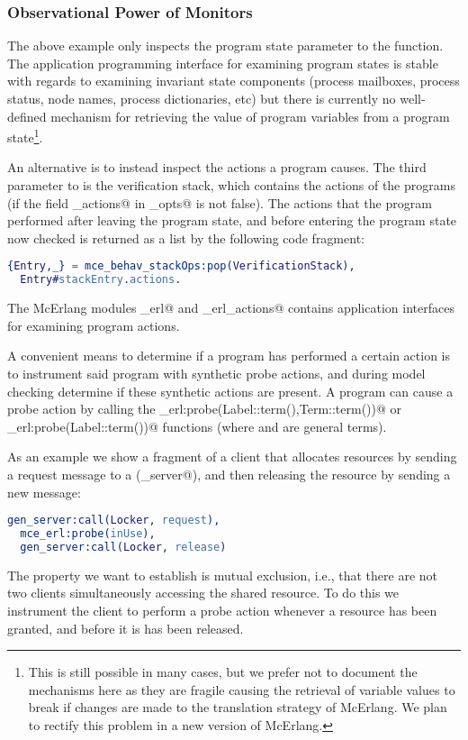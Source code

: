 \documentclass[a4paper]{article}
\begin{document}
\subsubsection{Observational Power of Monitors}
The above example only inspects the program
state parameter to the \lstinline@stateChange@ function.
The application programming interface for examining program states
is stable with regards to examining invariant state components
(process mailboxes, process status, node names, 
process dictionaries, etc) but there is currently no well-defined
mechanism for retrieving the value of program variables from 
a program state\footnote{This is still possible in many cases,
but we prefer not to document the mechanisms here as they are fragile
causing the retrieval of variable values
to break if changes are made to the translation
strategy of McErlang. We plan to rectify this
problem in a new version of McErlang.}.

An alternative is to instead inspect the actions a program causes.
The third parameter to \lstinline@stateChange@ is the verification stack,
which contains the actions of the programs (if the 
field \lstinline@record_actions@ in \lstinline@mce_opts@ is not false).
The actions that the program performed after leaving the program state,
and before entering the program state now checked is returned
as a list by the following code fragment:
\begin{lstlisting}[language=Erlang]
  {Entry,_} = mce_behav_stackOps:pop(VerificationStack),
  Entry#stackEntry.actions.
\end{lstlisting}

The McErlang modules \lstinline@mce_erl@ and
\lstinline@mce_erl_actions@ contains application interfaces for
examining program actions.

A convenient means to determine if a program has performed
a certain action is to instrument said program with synthetic
probe actions, and during model checking determine if these
synthetic actions are present. 
A program can cause a probe action by calling the 
\lstinline@mce_erl:probe(Label::term(),Term::term())@ or
\lstinline@mce_erl:probe(Label::term())@ functions
(where \lstinline@Label@ and \lstinline@Term@ are general terms).

As an example we show a fragment of a client that allocates resources
by sending a request message to a (\lstinline@gen_server@),
and then releasing the resource by sending a new message:
\begin{lstlisting}[language=Erlang]
  gen_server:call(Locker, request),
  mce_erl:probe(inUse),
  gen_server:call(Locker, release)
\end{lstlisting}
The property we want to establish is mutual exclusion,
i.e., that there are not two clients simultaneously accessing 
the shared resource. To do this we instrument the client 
to perform a probe action whenever a resource has been granted,
and before it is has been released.
\end{document}
